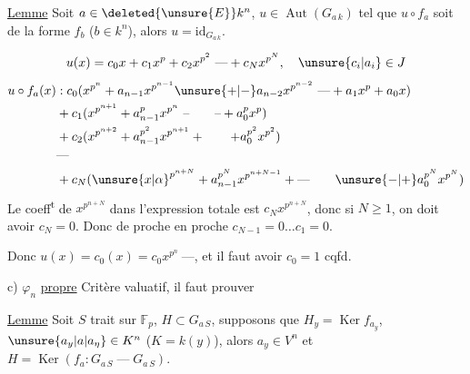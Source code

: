 
\uline{Lemme} Soit $a\in\deleted{\unsure{E}}k^n$, $u\in\operatorname{Aut}(G_{a\,k})$ tel que $u\circ f_a$ soit de la forme $f_b$ ($b\in k^n$), alors $u=\mathrm{id}_{G_{a\,k}}$.

\[
u(x)=c_0x+c_1x^p+c_2x^{p^2}\ \text{---}+c_Nx^{p^N},\quad \unsure{c_i|a_i}\in J
\]
\[
\begin{aligned}
u\circ f_a(x)&\mathrel{{:}}c_0(x^{p^n}+a_{n-1}x^{p^{n-1}}\unsure{+|-}a_{n-2}x^{p^{n-2}}\ \text{---}+a_1x^p+a_0x)\\
&+c_1(x^{p^{n+1}}+a_{n-1}^{p}x^{p^n}\ \text{--}\qquad\text{--}+a_0^p x^p)\\
&+c_2(x^{p^{n+2}}+a_{n-1}^{p^2}x^{p^{n+1}}+\qquad +a_0^{p^2}x^{p^2})\\
&\text{---}\\
&+c_N({\unsure{x|\alpha}}^{p^{n+N}}+a_{n-1}^{p^N}x^{p^{n+N-1}}+\text{---}\qquad \unsure{-|+}a_0^{p^N}x^{p^N})
\end{aligned}
\]
Le coeff\textsuperscript{t} de $x^{p^{n+N}}$ dans l'expression totale est $c_N x^{p^{n+N}}$, donc  si $N\geq 1$, on doit avoir $c_N=0$. Donc de proche en proche $c_{N-1}=0\ldots c_1=0$.

Donc $u(x)=c_0(x)=c_0 x^{p^n}\ \text{---}$, et il faut avoir $c_0=1$ cqfd.

c) $\varphi_n$  \uline{propre} Critère valuatif, il faut prouver 

\uline{Lemme} Soit $S$  trait sur $\mathbb F_p$,  $H\subset G_{a\,S}$,  supposons que $H_y=\operatorname{Ker} f_{a_y}$, $\unsure{a_y|a|a_\eta}\in K^n$ ($K=k(y)$), alors $a_y\in V^n$ et  $H=\operatorname{Ker}(f_a:G_{a\,S}\mathbin{\text{---}}G_{a\,S})$.
